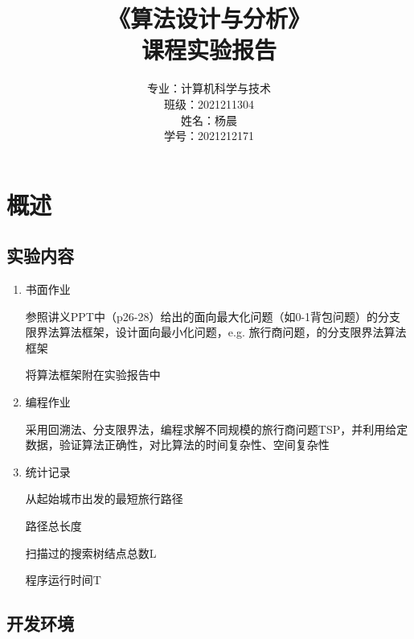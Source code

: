 \documentclass[lang=cn,11pt,a4paper]{elegantpaper}
\title{《算法设计与分析》\\课程实验报告}
\author{
\huge 专业：计算机科学与技术 \\[10pt]
\huge 班级：2021211304 \\[10pt]
\huge 姓名：杨晨 \\[10pt]
\huge 学号：2021212171
}
\date{}
\begin{document}
\maketitle

\clearpage



\section{概述}

\subsection{实验内容}

\begin{enumerate}
    \item 书面作业
    
    参照讲义PPT中（p26-28）给出的面向最大化问题（如0-1背包问题）的分支限界法算法框架，设计面向最小化问题，e.g. 旅行商问题，的分支限界法算法框架
    
    将算法框架附在实验报告中
    
    \item 编程作业
    
    采用回溯法、分支限界法，编程求解不同规模的旅行商问题TSP，并利用给定数据，验证算法正确性，对比算法的时间复杂性、空间复杂性

    \item 统计记录
    
    从起始城市出发的最短旅行路径
    
    路径总长度
    
    扫描过的搜索树结点总数L
    
    程序运行时间T
\end{enumerate}

\subsection{开发环境}
\end{document}

